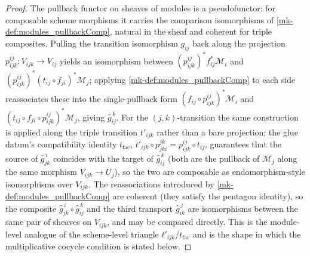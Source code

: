 \begin{proof}
  \leanok
  The pullback functor on sheaves of modules is a pseudofunctor: for composable
  scheme morphisms it carries the comparison isomorphisms of
  \ref{mk-def:modules_pullbackComp}, natural in the sheaf and coherent for triple
  composites. Pulling the transition isomorphism \(g_{ij}\) back along the projection
  \(p^{ij}_{ijk} : V_{ijk} \to V_{ij}\) yields an isomorphism between
  \((p^{ij}_{ijk})^{*} f_{ij}^{*}\mathcal{M}_i\) and \((p^{ij}_{ijk})^{*}(t_{ij} \circ
  f_{ji})^{*}\mathcal{M}_j\); applying \ref{mk-def:modules_pullbackComp} to each side
  reassociates these into the single-pullback form
  \((f_{ij} \circ p^{ij}_{ijk})^{*}\mathcal{M}_i\) and
  \((t_{ij} \circ f_{ji} \circ p^{ij}_{ijk})^{*}\mathcal{M}_j\), giving
  \(\widehat{g}_{ij}^{\,k}\). For the \((j,k)\)-transition the same construction is
  applied along the triple transition \(t'_{ijk}\) rather than a bare projection; the
  glue datum's compatibility identity \(t_{\mathrm{fac}}\),
  \(t'_{ijk} \circ p^{jk}_{jki} = p^{ij}_{ijk} \circ t_{ij}\), guarantees that the
  source of \(\widehat{g}_{jk}^{\,i}\) coincides with the target of
  \(\widehat{g}_{ij}^{\,k}\) (both are the pullback of \(\mathcal{M}_j\) along the same
  morphism \(V_{ijk} \to U_j\)), so the two are composable as endomorphism-style
  isomorphisms over \(V_{ijk}\). The reassociations introduced by
  \ref{mk-def:modules_pullbackComp} are coherent (they satisfy the pentagon identity), so
  the composite \(\widehat{g}_{jk}^{\,i} \circ \widehat{g}_{ij}^{\,k}\) and the third
  transport \(\widehat{g}_{ik}^{\,j}\) are isomorphisms between the same pair of
  sheaves on \(V_{ijk}\), and may be compared directly. This is the module-level
  analogue of the scheme-level triangle \(t'_{ijk}\)/\(t_{\mathrm{fac}}\) and is the
  shape in which the multiplicative cocycle condition is stated below.
\end{proof}

